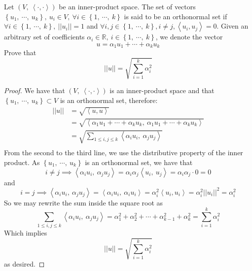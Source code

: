 \documentclass{article}
\newcommand{\gnorm}[1]{\left|\left|#1\right|\right|}
\newcommand{\parens}[1]{\left(#1\right)}
\newcommand{\bracks}[1]{\left\{#1\right\}}
\newcommand{\R}{\mathbb{R}}
\newcommand{\abracks}[1]{\left< #1\right>}
\begin{document}
	\item Let $\parens{V,\ \abracks{\cdot,\cdot}}$ be an inner-product space. The set of vectors $\bracks{u_1,\ \cdots,\ u_k},\ u_i \in V,\ \forall i \in \bracks{1,\ \cdots,\ k}$ is said to be an orthonormal set if $\forall i \in \bracks{1,\ \cdots,\ k},\ \gnorm{u_i} = 1$ and $\forall i,j \in \bracks{1,\ \cdots,\ k}, i \neq j, \abracks{u_i, u_j} = 0$. Given an arbitrary set of coefficients $\alpha_i \in \R,\ i \in \bracks{1,\ \cdots,\ k}$, we denote the vector
	$$u = \alpha_1u_1 + \cdots + \alpha_ku_k$$
	Prove that 
	$$\gnorm{u} = \sqrt{\sum_{i=1}^k \alpha_i^2}$$ 
	\begin{proof}
	We have that $\parens{V,\ \abracks{\cdot,\cdot}}$ is an inner-product space and that $\bracks{u_1,\ \cdots,\ u_k} \subset V$ is an orthonormal set, therefore:
	\begin{align*}
	\gnorm{u} &= \sqrt{\abracks{u,u}} \\
	&= \sqrt{\abracks{\alpha_1u_1 + \cdots + \alpha_ku_k,\ \alpha_1u_1 + \cdots + \alpha_ku_k}} \\
	&= \sqrt{\sum_{1 \leq i, j \leq k} \abracks{\alpha_iu_i,\ \alpha_ju_j}} \\
	\end{align*}
	From the second to the third line, we use the distributive property of the inner product. As $\bracks{u_1,\ \cdots,\ u_k}$ is an orthonormal set, we have that 
	$$i\neq j \implies \abracks{\alpha_iu_i,\ \alpha_ju_j} = \alpha_i\alpha_j \abracks{u_i,\ u_j} = \alpha_i\alpha_j\cdot0 = 0$$
	and
	$$i = j \implies \abracks{\alpha_iu_i,\ \alpha_ju_j} = \abracks{\alpha_iu_i,\ \alpha_iu_i} = \alpha_i^2\abracks{u_i,u_i} = \alpha_i^2\gnorm{u_i}^2 =  \alpha_i^2$$
	So we may rewrite the sum inside the square root as
	$$\sum_{1 \leq i, j \leq k} \abracks{\alpha_iu_i,\ \alpha_ju_j} = \alpha_1^2 + \alpha_2^2 + \cdots + \alpha_{k-1}^2 + \alpha_k^2 = \sum_{i=1}^k \alpha_i^2$$
	Which implies
	$$\gnorm{u} = \sqrt{\sum_{i=1}^k \alpha_i^2}$$
	as desired.
	\end{proof}
	
\end{document}
